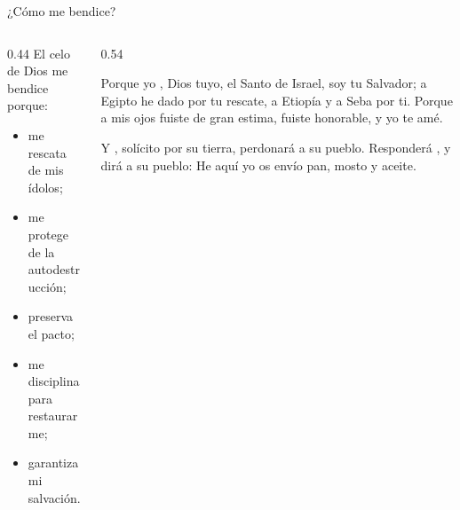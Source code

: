 \begin{frame}{¿Cómo me bendice?}
\begin{columns}[t,onlytextwidth]
\begin{column}{0.44\textwidth}\small
El celo de Dios me bendice porque:
\begin{itemize}
\item me rescata de mis ídolos;
\item me protege de la autodestrucción;
\item preserva el pacto;
\item me disciplina para restaurarme;
\item garantiza mi salvación.
\end{itemize}
\begin{center}\end{center}
\end{column}
\begin{column}{0.54\textwidth}
\begin{cita}Porque yo \SENOR, Dios tuyo, el Santo de Israel, soy tu Salvador; a Egipto he dado por tu rescate, a Etiopía y a Seba por ti. Porque a mis ojos fuiste de gran estima, fuiste honorable, y yo te amé.\end{cita}
\begin{cita}Y \SENOR, solícito por su tierra, perdonará a su pueblo. Responderá \SENOR, y dirá a su pueblo: He aquí yo os envío pan, mosto y aceite.\end{cita}
\end{column}
\end{columns}
\end{frame}

